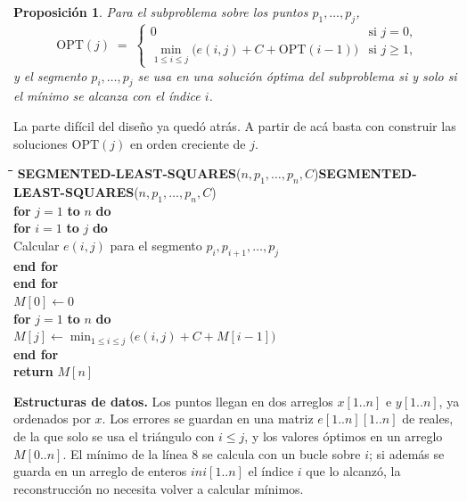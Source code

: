 \documentclass[12pt, spanish, oneside, openany]{book}
\newcommand{\pl}[1]{\makebox[1.6em][r]{\texttt{\footnotesize #1}}\hspace{0.9em}}
\newenvironment{pseudo}[1]{%
  \begin{center}%
  \begin{mdframed}[style=pseudobox]%
  \small
  \begin{tabbing}%
  \hspace{2.5em}\=\hspace{1.5em}\=\hspace{1.5em}\=\hspace{1.5em}\=\hspace{1.5em}\=\kill
  \def\pseudotitulo{#1}\ifx\pseudotitulo\empty\else#1\\[3pt]\fi}%
  {\end{tabbing}\end{mdframed}\end{center}}
\newenvironment{estructuras}%
  {\begin{center}\begin{minipage}{0.93\textwidth}\begin{mdframed}[style=estrbox]%
   \small\textbf{Estructuras de datos.}\;}%
  {\end{mdframed}\end{minipage}\end{center}}
\theoremstyle{uprightplain}
\newtheorem{proposicion}[teorema]{Proposición}
\theoremstyle{definition}
\theoremstyle{remark}
\theoremstyle{definition}
\newcommand{\OPT}{\mathrm{OPT}} %
\begin{document}
\begin{proposicion}
\label{prop:dp-mcs-recurrencia}
Para el subproblema sobre los puntos $p_1,\dots,p_j$,
\begin{equation}
\label{eq:dp-mcs}
\OPT(j) \;=\;
\begin{cases}
0 & \text{si } j=0,\\[2pt]
\displaystyle\min_{1\le i\le j}\bigl(e(i,j)+C+\OPT(i-1)\bigr) & \text{si } j\ge 1,
\end{cases}
\end{equation}
y el segmento $p_i,\dots,p_j$ se usa en una solución óptima del subproblema si y solo si el mínimo se alcanza con el índice $i$.
\end{proposicion}

La parte difícil del diseño ya quedó atrás. A partir de acá basta con construir las soluciones $\OPT(j)$ en orden creciente de $j$.

\begin{pseudo}{\textbf{SEGMENTED-LEAST-SQUARES}($n, p_1,\dots,p_n, C$)}
\pl{1}\> \textbf{for} $j = 1$ \textbf{to} $n$ \textbf{do}\\
\pl{2}\>\> \textbf{for} $i = 1$ \textbf{to} $j$ \textbf{do}\\
\pl{3}\>\>\> Calcular $e(i,j)$ para el segmento $p_i,p_{i+1},\dots,p_j$\\
\pl{4}\>\> \textbf{end for}\\
\pl{5}\> \textbf{end for}\\
\pl{6}\> $M[0] \leftarrow 0$\\
\pl{7}\> \textbf{for} $j = 1$ \textbf{to} $n$ \textbf{do}\\
\pl{8}\>\> $M[j] \leftarrow \min_{1\le i\le j}\bigl(e(i,j)+C+M[i-1]\bigr)$\\
\pl{9}\> \textbf{end for}\\
\pl{10}\> \textbf{return} $M[n]$
\end{pseudo}

\begin{estructuras}
Los puntos llegan en dos arreglos $x[1..n]$ e $y[1..n]$, ya ordenados por $x$.
Los errores se guardan en una matriz $e[1..n][1..n]$ de reales, de la que solo
se usa el triángulo con $i\le j$, y los valores óptimos en un arreglo
$M[0..n]$. El mínimo de la línea $8$ se calcula con un bucle sobre $i$; si
además se guarda en un arreglo de enteros $\mathit{ini}[1..n]$ el índice $i$
que lo alcanzó, la reconstrucción no necesita volver a calcular mínimos.
\end{estructuras}
\end{document}
